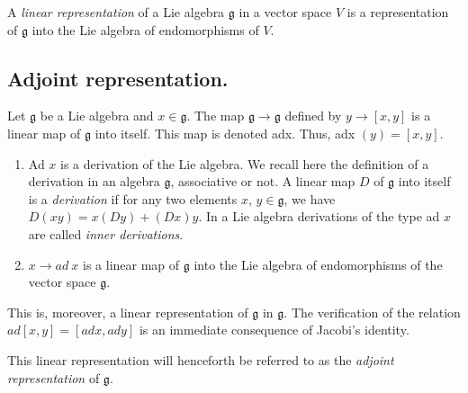 \begin{defi*}%
A {\em linear representation} of a Lie algebra $\mathfrak{g}$ in a vector
space $V$ is a representation of $\mathfrak{g}$ into the Lie algebra of
endomorphisms of $V$. 
\end{defi*}

\subsection{Adjoint representation.}\label{chap2-sec2.8}%

Let $\mathfrak{g}$ be a Lie algebra and $x \in \mathfrak{g}$. The map
$\mathfrak{g} \rightarrow \mathfrak{g}$  defined by $y
\longrightarrow[x, y]$ is a linear map of $\mathfrak{g}$ into
itself. This map is denoted adx. Thus, adx $(y)=[x, y]$. 


\begin{remarks*}
\begin{enumerate}
\renewcommand{\labelenumi}{(\theenumi)}
\item Ad $x$ is a derivation of the Lie algebra. We recall here the
  definition of a derivation in an algebra $\mathfrak{g}$, associative
  or not. A linear map $D$ of $\mathfrak{g}$ into itself is a
  \textit{derivation} if for any two elements $x$, $y \in
  \mathfrak{g}$, 
  we have $D (xy)=x(Dy)+(Dx)y$. In a Lie algebra derivations of the
  type ad $x$ are called \textit{inner derivations}.  

\item $x \rightarrow ad\ x$ is a linear map of $\mathfrak{g}$ into
  the Lie algebra of endomorphisms of the vector space $\mathfrak{g}$. 
\end{enumerate}
\end{remarks*}

This is, moreover, a linear representation of $\mathfrak{g}$ in
$\mathfrak{g}$. The verification of the relation $ad[x, y]=[adx, ady]$
is an immediate consequence of Jacobi's identity. 

This linear representation will henceforth be referred to as the
\textit{adjoint representation} of $\mathfrak{g}$.  
